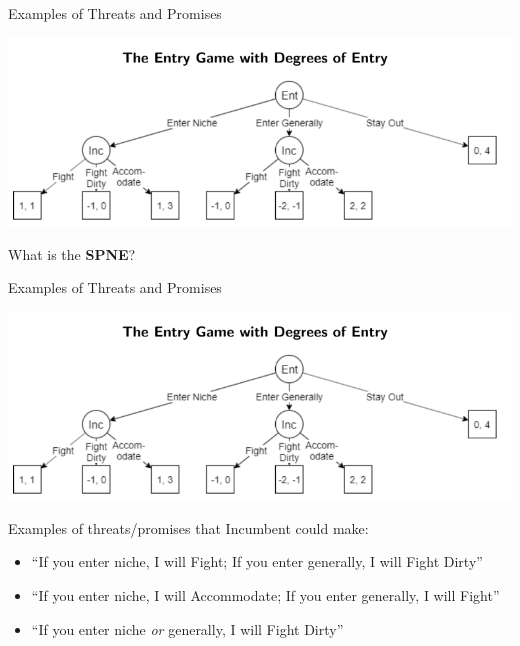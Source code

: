 
\begin{frame}{Examples of Threats and Promises}
  \begin{center}
    \includegraphics[width=1\textwidth]{figures/entrygame.png} 
  \end{center} 
  What is the \textbf{SPNE}?
\end{frame}


\begin{frame}{Examples of Threats and Promises}
  \begin{center}
    \includegraphics[width=.7\textwidth] {figures/entrygame.png}
  \end{center} 
  Examples of threats/promises that \alert{Incumbent} could make:
  \begin{itemize}
    \item ``If you enter niche, I will Fight; If you enter generally, I will Fight Dirty''
    \item ``If you enter niche, I will Accommodate; If you enter generally, I will Fight''
    \item ``If you enter niche \textit{or} generally, I will Fight Dirty''
  \end{itemize}
\end{frame}


